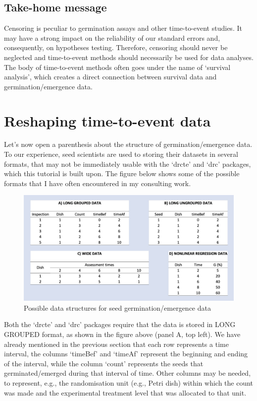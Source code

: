 \documentclass[
]{book}
\begin{document}
\hypertarget{take-home-message}{%
\section{Take-home message}\label{take-home-message}}

Censoring is peculiar to germination assays and other time-to-event studies. It may have a strong impact on the reliability of our standard errors and, consequently, on hypotheses testing. Therefore, censoring should never be neglected and time-to-event methods should necessarily be used for data analyses. The body of time-to-event methods often goes under the name of `survival analysis', which creates a direct connection between survival data and germination/emergence data.

\hypertarget{reshaping-time-to-event-data}{%
\chapter{Reshaping time-to-event data}\label{reshaping-time-to-event-data}}

Let's now open a parenthesis about the structure of germination/emergence data. To our experience, seed scientists are used to storing their datasets in several formats, that may not be immediately usable with the `drcte' and `drc' packages, which this tutorial is built upon. The figure below shows some of the possible formats that I have often encountered in my consulting work.

\begin{figure}

{\centering \includegraphics[width=0.9\linewidth]{_Figures/Stat_drcte_3-method-data} 

}

\caption{Possible data structures for seed germination/emergence data}\label{fig:figName2}
\end{figure}

Both the `drcte' and `drc' packages require that the data is stored in LONG GROUPED format, as shown in the figure above (panel A, top left). We have already mentioned in the previous section that each row represents a time interval, the columns `timeBef' and `timeAf' represent the beginning and ending of the interval, while the column `count' represents the seeds that germinated/emerged during that interval of time. Other columns may be needed, to represent, e.g., the randomisation unit (e.g., Petri dish) within which the count was made and the experimental treatment level that was allocated to that unit.
\end{document}
